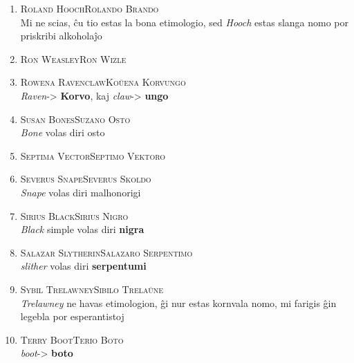 \begin{enumerate}
\item\label{nomoj:brando} \textsc{Roland Hooch}\dotfill \textsc{Rolando Brando}\\
{\footnotesize \indent Mi ne scias, ĉu tio estas la bona etimologio, sed \emph{Hooch} estas slanga nomo por priskribi alkoholaĵo}
\smallskip

\item\label{nomoj:wizle} \textsc{Ron Weasley}\dotfill \textsc{Ron Wizle}\\
\smallskip

\item\label{nomoj:korvungo} \textsc{Rowena Ravenclaw}\dotfill \textsc{Koŭena Korvungo}\\
\label {nomoj-korvungo}
{\footnotesize \indent \emph{Raven}-> \textbf{Korvo}, kaj \emph{claw}-> \textbf{ungo}}
\smallskip

\item\label{nomoj:osto} \textsc{Susan Bones}\dotfill \textsc{Suzano Osto}\\
{\footnotesize \indent \emph{Bone} volas diri osto}
\smallskip

\item\label{nomoj:vektoro} \textsc{Septima Vector}\dotfill \textsc{Septimo Vektoro}\\
\smallskip

\item\label{nomoj:skoldo} \textsc{Severus Snape}\dotfill \textsc{Severus Skoldo}\\
{\footnotesize \indent \emph{Snape} volas diri malhonorigi}
\smallskip

\item\label{nomoj:nigro} \textsc{Sirius Black}\dotfill \textsc{Sirius Nigro}\\
{\footnotesize \indent \emph{Black} simple volas diri \textbf{nigra}}
\smallskip

\item\label{nomoj:serpentimo} \textsc{Salazar Slytherin}\dotfill \textsc{Salazaro Serpentimo}\\
{\footnotesize \indent \emph{slither} volas diri \textbf{serpentumi}}
\smallskip

\item\label{nomoj:trelaŭne} \textsc{Sybil Trelawney}\dotfill \textsc{Sibilo Trelaŭne}\\
{\footnotesize \indent \emph{Trelawney} ne havas etimologion, ĝi nur estas kornvala nomo, mi farigis ĝin legebla por esperantistoj}
\smallskip

\item\label{nomoj:boto} \textsc{Terry Boot}\dotfill \textsc{Terio Boto}\\
{\footnotesize \indent \emph{boot}-> \textbf{boto}}
\smallskip


\end{enumerate}
